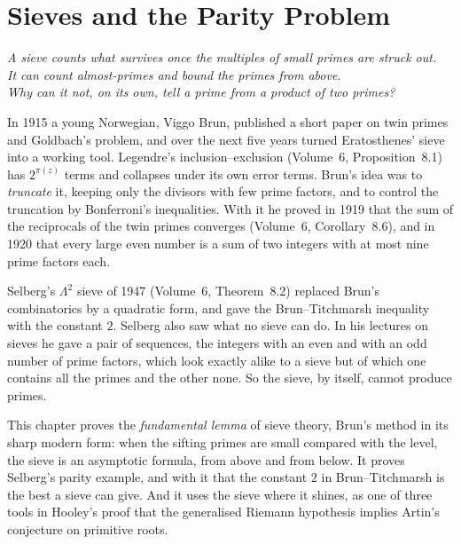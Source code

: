 \chapter{Sieves and the Parity Problem}\label{ch:sieves}
\begin{center}\itshape
A sieve counts what survives once the multiples of small primes are struck out.\\
It can count almost-primes and bound the primes from above.\\
Why can it not, on its own, tell a prime from a product of two primes?
\end{center}

In 1915 a young Norwegian, Viggo Brun, published a short paper on twin primes and Goldbach's problem, and over the next five years turned Eratosthenes' sieve into a working tool. Legendre's inclusion--exclusion (Volume~6, Proposition~8.1) has $2^{\pi(z)}$ terms and collapses under its own error terms. Brun's idea was to \emph{truncate} it, keeping only the divisors with few prime factors, and to control the truncation by Bonferroni's inequalities. With it he proved in 1919 that the sum of the reciprocals of the twin primes converges (Volume~6, Corollary~8.6), and in 1920 that every large even number is a sum of two integers with at most nine prime factors each.

Selberg's $\Lambda^2$ sieve of 1947 (Volume~6, Theorem~8.2) replaced Brun's combinatorics by a quadratic form, and gave the Brun--Titchmarsh inequality with the constant $2$. Selberg also saw what no sieve can do. In his lectures on sieves he gave a pair of sequences, the integers with an even and with an odd number of prime factors, which look exactly alike to a sieve but of which one contains all the primes and the other none. So the sieve, by itself, cannot produce primes.

This chapter proves the \emph{fundamental lemma} of sieve theory, Brun's method in its sharp modern form: when the sifting primes are small compared with the level, the sieve is an asymptotic formula, from above and from below. It proves Selberg's parity example, and with it that the constant $2$ in Brun--Titchmarsh is the best a sieve can give. And it uses the sieve where it shines, as one of three tools in Hooley's proof that the generalised Riemann hypothesis implies Artin's conjecture on primitive roots.

